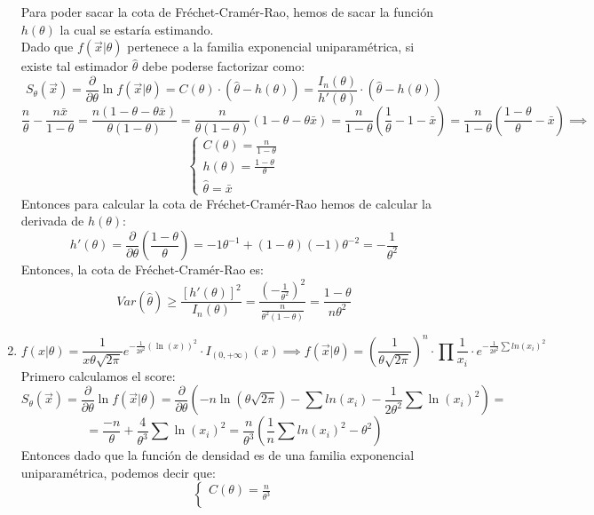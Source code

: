\begin{sol}
\begin{enumerate}
      Para poder sacar la cota de Fréchet-Cramér-Rao, hemos de sacar la función $h(\theta)$ la cual se estaría estimando. \\
      Dado que $f(\vec{x} | \theta)$ pertenece a la familia exponencial uniparamétrica, si existe tal estimador $\hat{\theta}$ debe poderse factorizar como: 
      $$S_{\theta}(\vec{x}) = \frac{\partial}{\partial \theta} \ln f(\vec{x} | \theta) = C(\theta) \cdot (\hat{\theta} - h(\theta)) = \frac{I_n(\theta)}{h'(\theta)}\cdot(\hat{\theta} - h(\theta))$$
      $$\frac{n}{\theta} - \frac{n\bar{x}}{1 - \theta} = \frac{n(1 - \theta -\theta\bar{x})}{\theta(1 - \theta)} = \frac{n}{\theta(1 - \theta)}\left(1 - \theta - \theta\bar{x}\right) = \frac{n}{1 - \theta}\left(\frac{1}{\theta} - 1 - \bar{x}\right) = \frac{n}{1 - \theta}\left(\frac{1 - \theta}{\theta} - \bar{x}\right) \implies$$
      $$\begin{cases}
        C(\theta) = \frac{n}{1 - \theta} \\
        h(\theta) = \frac{1 - \theta}{\theta} \\
        \hat{\theta} = \bar{x}
      \end{cases}$$
      Entonces para calcular la cota de Fréchet-Cramér-Rao hemos de calcular la derivada de $h(\theta)$:
      $$h'(\theta) = \frac{\partial}{\partial \theta}\left(\frac{1 - \theta}{\theta}\right) = -1\theta^{-1} + (1 - \theta)(-1)\theta^{-2} = -\frac{1}{\theta^2}$$
      Entonces, la cota de Fréchet-Cramér-Rao es:
      $$Var({\hat{\theta}}) \geq \frac{[h'(\theta)]^2}{I_n(\theta)} = \frac{\left(-\frac{1}{\theta^2}\right)^2}{\frac{n}{\theta^2(1 - \theta)}} = \frac{1 - \theta}{n\theta^2}$$
    \item 
      $$f(x | \theta) = \frac{1}{x\theta\sqrt{2\pi}} e^{-\frac{1}{2\theta^2}(\ln(x))^2} \cdot I_{(0, +\infty)}(x) \implies f(\vec{x} | \theta) = \left(\frac{1}{\theta\sqrt{2\pi}}\right)^n \cdot \prod \frac{1}{x_i} \cdot e^{-\frac{1}{2\theta^2}\sum ln(x_i)^2}$$
      Primero calculamos el score: 
      $$S_{\theta}(\vec{x}) = \frac{\partial}{\partial \theta} \ln f(\vec{x} | \theta) = \frac{\partial}{\partial \theta} \left(-n\ln(\theta\sqrt{2\pi}) - \sum ln(x_i) -\frac{1}{2\theta^2}\sum \ln(x_i)^2\right) = $$
      $$ = \frac{-n}{\theta} + \frac{4}{\theta^3} \sum \ln(x_i)^2 = \frac{n}{\theta^3}\left(\frac{1}{n}\sum ln(x_i)^2 - \theta^2\right)$$
      Entonces dado que la función de densidad es de una familia exponencial uniparamétrica, podemos decir que: 
      $$\begin{cases}
        C(\theta) = \frac{n}{\theta^3} \\

\end{cases}$$
\end{enumerate}
\end{sol}
